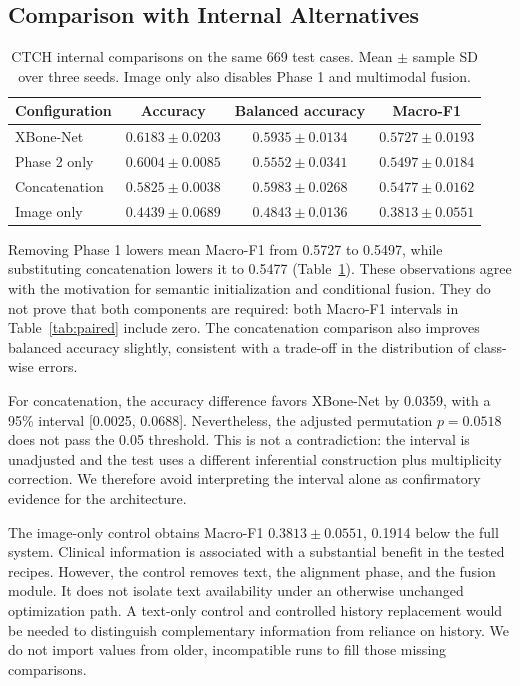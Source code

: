 \documentclass{llncs}
\begin{document}
\subsection{Comparison with Internal Alternatives}
\begin{table}[t]
\caption{CTCH internal comparisons on the same 669 test cases. Mean $\pm$ sample SD over three seeds. Image only also disables Phase 1 and multimodal fusion.}
\label{tab:ablation}
\centering\small
\begin{tabular}{@{}lccc@{}}
\toprule
Configuration & Accuracy & Balanced accuracy & Macro-F1 \\
\midrule
XBone-Net & $0.6183\pm0.0203$ & $0.5935\pm0.0134$ & $0.5727\pm0.0193$\\
Phase 2 only & $0.6004\pm0.0085$ & $0.5552\pm0.0341$ & $0.5497\pm0.0184$\\
Concatenation & $0.5825\pm0.0038$ & $0.5983\pm0.0268$ & $0.5477\pm0.0162$\\
Image only & $0.4439\pm0.0689$ & $0.4843\pm0.0136$ & $0.3813\pm0.0551$\\
\bottomrule
\end{tabular}
\end{table}

Removing Phase 1 lowers mean Macro-F1 from 0.5727 to 0.5497, while substituting concatenation lowers it to 0.5477 (Table~\ref{tab:ablation}). These observations agree with the motivation for semantic initialization and conditional fusion. They do not prove that both components are required: both Macro-F1 intervals in Table~\ref{tab:paired} include zero. The concatenation comparison also improves balanced accuracy slightly, consistent with a trade-off in the distribution of class-wise errors.

For concatenation, the accuracy difference favors XBone-Net by 0.0359, with a 95\% interval [0.0025, 0.0688]. Nevertheless, the adjusted permutation $p=0.0518$ does not pass the 0.05 threshold. This is not a contradiction: the interval is unadjusted and the test uses a different inferential construction plus multiplicity correction. We therefore avoid interpreting the interval alone as confirmatory evidence for the architecture.

The image-only control obtains Macro-F1 $0.3813\pm0.0551$, 0.1914 below the full system. Clinical information is associated with a substantial benefit in the tested recipes. However, the control removes text, the alignment phase, and the fusion module. It does not isolate text availability under an otherwise unchanged optimization path. A text-only control and controlled history replacement would be needed to distinguish complementary information from reliance on history. We do not import values from older, incompatible runs to fill those missing comparisons.
\end{document}
